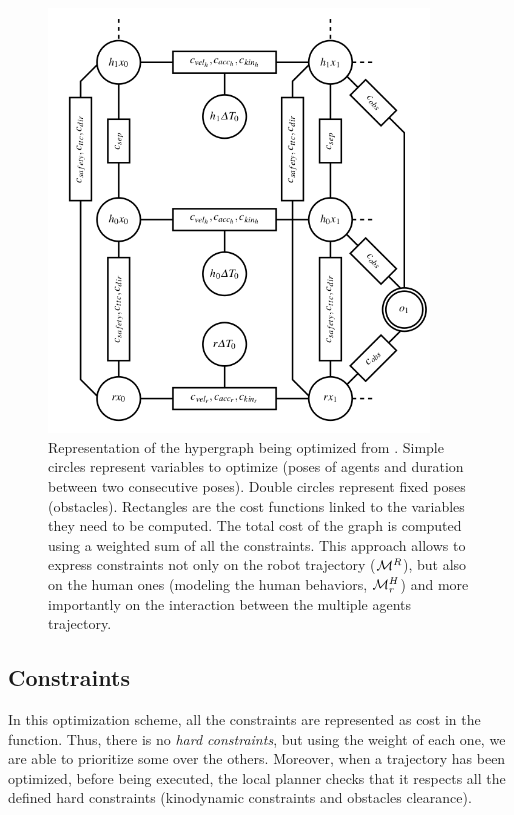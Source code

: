 \documentclass[a4paper,11pt,twoside]{StyleThese}
\begin{document}
\begin{figure}[hbtp]
\centering
\includegraphics[width=0.9\textwidth]{figures/chapter2/hateb_graph.png}
\caption{Representation of the hypergraph being optimized from \cite{khambhaita_viewing_2017}. Simple circles represent variables to optimize (poses of agents and duration between two consecutive poses). Double circles represent fixed poses (obstacles). Rectangles are the cost functions linked to the variables they need to be computed. The total cost of the graph is computed using a weighted sum of all the constraints. This approach allows to express constraints not only on the robot trajectory ($\mathcal{M}^R$), but also on the human ones (modeling the human behaviors, $\mathcal{M}^H_r$) and more importantly on the interaction between the multiple agents trajectory.}
\label{fig:hateb_graph}
\end{figure}


\subsection{Constraints}
In this optimization scheme, all the constraints are represented as cost in the function. Thus, there is no \textit{hard constraints}, but using the weight of each one, we are able to prioritize some over the others. Moreover, when a trajectory has been optimized, before being executed, the local planner checks that it respects all the defined hard constraints (kinodynamic constraints and obstacles clearance).
\end{document}
